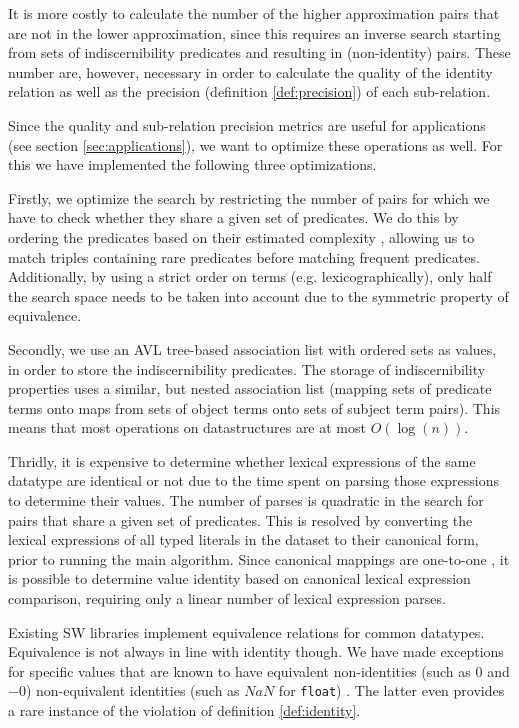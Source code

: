 It is more costly to calculate the number of the higher approximation pairs
  that are not in the lower approximation,
  since this requires an inverse search
  starting from sets of indiscernibility predicates
  and resulting in (non-identity) pairs.
These number are, however, necessary in order to
  calculate the quality of the identity relation
  as well as the precision (definition \ref{def:precision})
  of each sub-relation.

Since the quality and sub-relation precision metrics are
  useful for applications (see section \ref{sec:applications}),
  we want to optimize these operations as well.
For this we have implemented the following three optimizations.

Firstly, we optimize the search by restricting the number of pairs
  for which we have to check whether they share a given set of predicates.
We do this by ordering the predicates based on their
  estimated complexity \cite{Wielemaker2005},
  allowing us to match triples containing rare predicates before
  matching frequent predicates.
Additionally, by using a strict order on terms (e.g. lexicographically),
  only half the search space needs to be taken into account
  due to the symmetric property of equivalence.

Secondly, we use an AVL tree-based association list
  with ordered sets as values,
  in order to store the indiscernibility predicates.
The storage of indiscernibility properties uses a similar, but nested
  association list (mapping sets of predicate terms onto
  maps from sets of object terms onto sets of subject term pairs).
This means that most operations on datastructures are at most $O(\log(n))$.

Thridly, it is expensive to determine whether lexical expressions
  of the same datatype are identical or not
  due to the time spent on parsing those expressions
  to determine their values.
The number of parses is quadratic in the search for pairs that share
  a given set of predicates.
This is resolved by converting the lexical expressions
  of all typed literals in the dataset to their canonical form,
  prior to running the main algorithm.
Since canonical mappings are one-to-one \cite{XmlSchema2012},
  it is possible to determine value identity based on
  canonical lexical expression comparison,
  requiring only a linear number of lexical expression parses.

Existing SW libraries implement equivalence relations for common datatypes.
Equivalence is not always in line with identity though.
We have made exceptions for specific values that are known to have
  equivalent non-identities (such as $0$ and $-0$)
  non-equivalent identities (such as $NaN$ for \texttt{float}) \cite{XSD11}.
The latter even provides a rare instance of the violation of
  definition \ref{def:identity}.


